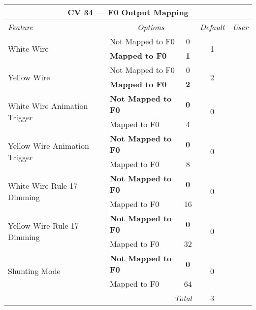 \documentclass[12pt,letterpaper,draft]{memoir} %
\begin{document}
\label{CV34}
\begin{center}
\begin{tabular}{|l|lc|c|c|}
\hline
\multicolumn{5}{|c|}{\textbf{CV 34 --- F0 Output Mapping}} \\ \hline \hline
\textit{Feature} & \multicolumn{2}{c|}{\textit{Options}} & \textit{Default} & \textit{User} \\ \hline
\multirow{2}{*}{White Wire} & Not Mapped to F0 & 0	& 	\multirow{2}{*}{1}&\\
                             & \textbf{Mapped to F0} & \textbf{1} & & \\ \hline
\multirow{2}{*}{Yellow Wire} & Not Mapped to F0 & 0	& 	\multirow{2}{*}{2}&\\
                             & \textbf{Mapped to F0} & \textbf{2} & & \\ \hline
\multirow{2}{*}{White Wire Animation Trigger} & \textbf{Not Mapped to F0} & \textbf{0}	& 	\multirow{2}{*}{0}& \\
                             & Mapped to F0 & 4 & & \\ \hline
\multirow{2}{*}{Yellow Wire Animation Trigger} & \textbf{Not Mapped to F0} & \textbf{0}	& 	\multirow{2}{*}{0}&\\
                             & Mapped to F0 & 8 & & \\ \hline
\multirow{2}{*}{White Wire Rule 17 Dimming} & \textbf{Not Mapped to F0} & \textbf{0}	& 	\multirow{2}{*}{0}& \\
                             & Mapped to F0 & 16 & & \\ \hline
\multirow{2}{*}{Yellow Wire Rule 17 Dimming} & \textbf{Not Mapped to F0} & \textbf{0}	& 	\multirow{2}{*}{0}& \\
                             & Mapped to F0 & 32 & & \\ \hline
\multirow{2}{*}{Shunting Mode}  & \textbf{Not Mapped to F0} & \textbf{0}	& 	\multirow{2}{*}{0}&\\
                             & Mapped to F0 & 64 & & \\ \hline\hline
\multicolumn{3}{|r|}{\textit{Total}} & 3 &\\ \hline
\end{tabular}
\end{center}
\end{document}
